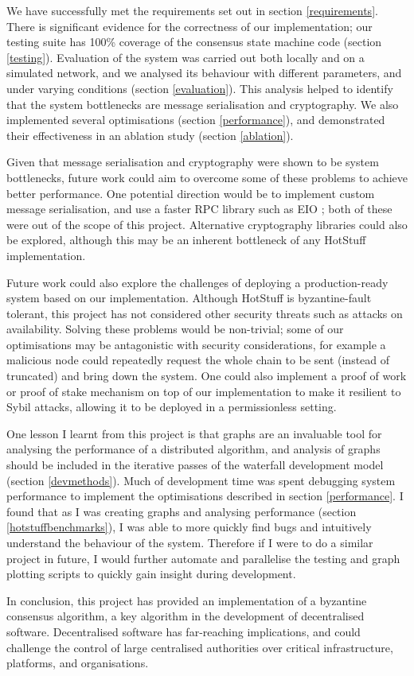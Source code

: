 We have successfully met the requirements set out in section \ref{requirements}. There is significant evidence for the correctness of our implementation; our testing suite has 100\% coverage of the consensus state machine code (section \ref{testing}). Evaluation of the system was carried out both locally and on a simulated network, and we analysed its behaviour with different parameters, and under varying conditions (section \ref{evaluation}). This analysis helped to identify that the system bottlenecks are message serialisation and cryptography. We also implemented several optimisations (section \ref{performance}), and demonstrated their effectiveness in an ablation study (section \ref{ablation}).

Given that message serialisation and cryptography were shown to be system bottlenecks, future work could aim to overcome some of these problems to achieve better performance. One potential direction would be to implement custom message serialisation, and use a faster RPC library such as EIO \cite{noauthor_eio_2023}; both of these were out of the scope of this project. Alternative cryptography libraries could also be explored, although this may be an inherent bottleneck of any HotStuff implementation.

Future work could also explore the challenges of deploying a production-ready system based on our implementation. Although HotStuff is byzantine-fault tolerant, this project has not considered other security threats such as attacks on availability. Solving these problems would be non-trivial; some of our optimisations may be antagonistic with security considerations, for example a malicious node could repeatedly request the whole chain to be sent (instead of truncated) and bring down the system. One could also implement a proof of work or proof of stake mechanism on top of our implementation to make it resilient to Sybil attacks, allowing it to be deployed in a permissionless setting.

One lesson I learnt from this project is that graphs are an invaluable tool for analysing the performance of a distributed algorithm, and analysis of graphs should be included in the iterative passes of the waterfall development model (section \ref{devmethods}). Much of development time was spent debugging system performance to implement the optimisations described in section \ref{performance}. I found that as I was creating graphs and analysing performance (section \ref{hotstuffbenchmarks}), I was able to more quickly find bugs and intuitively understand the behaviour of the system. Therefore if I were to do a similar project in future, I would further automate and parallelise the testing and graph plotting scripts to quickly gain insight during development.

In conclusion, this project has provided an implementation of a byzantine consensus algorithm, a key algorithm in the development of decentralised software. Decentralised software has far-reaching implications, and could challenge the control of large centralised authorities over critical infrastructure, platforms, and organisations.